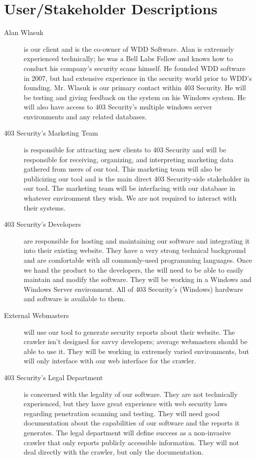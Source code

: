 \section{User/Stakeholder Descriptions}
\begin{description}
\item[Alan Wlasuk] is our client and is the co-owner of WDD Software.  Alan is extremely experienced technically; he was a Bell Labs Fellow and knows how to conduct his company’s security scans himself. He founded WDD software in 2007, but had extensive experience in the security world prior to WDD’s founding.  Mr. Wlasuk is our primary contact within 403 Security.  He will be testing and giving feedback on the system on his Windows system.  He will also have access to 403 Security’s multiple windows server environments and any related databases.

\item[403 Security’s Marketing Team] is responsible for attracting new clients to 403 Security and will be responsible for receiving, organizing, and interpreting marketing data gathered from users of our tool. This marketing team will also be publicizing our tool and is the main direct 403 Security-side stakeholder in our tool. The marketing team will be interfacing with our database in whatever environment they wish.  We are not required to interact with their systems.  

\item[403 Security’s Developers] are responsible for hosting and maintaining our software and integrating it into their existing website. They have a very strong technical background and are comfortable with all commonly-used programming languages. Once we hand the product to the developers, the will need to be able to easily maintain and modify the software.  They will be working in a Windows and Windows Server environment.  All of 403 Security’s (Windows) hardware and software is available to them.

\item[External Webmasters] will use our tool to generate security reports about their website.  The crawler isn’t designed for savvy developers; average webmasters should be able to use it. They will be working in extremely varied environments, but will only interface with our web interface for the crawler.

\item[403 Security’s Legal Department] is concerned with the legality of our software. They are not technically experienced, but they have great experience with web security laws regarding penetration scanning and testing. They will need good documentation about the capabilities of our software and the reports it generates. The legal department will define success as a non-invasive crawler that only reports publicly accessible information.  They will not deal directly with the crawler, but only the documentation.


\end{description}
